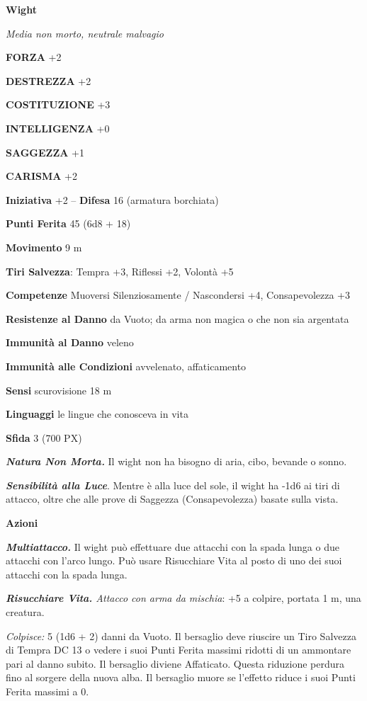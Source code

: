 \begin{multicols}{2}
	\medskip{}\textbf{Wight}

	\textit{Media non morto, neutrale malvagio}

	\textbf{FORZA} +2

	\textbf{DESTREZZA} +2

	\textbf{COSTITUZIONE} +3

	\textbf{INTELLIGENZA} +0

	\textbf{SAGGEZZA} +1

	\textbf{CARISMA} +2

	\textbf{Iniziativa} +2 -- \textbf{Difesa} 16 (armatura borchiata)

	\textbf{Punti Ferita} 45 (6d8 + 18)

	\textbf{Movimento} 9 m

	\textbf{Tiri Salvezza}: Tempra +3, Riflessi +2, Volontà +5

	\textbf{Competenze} Muoversi Silenziosamente / Nascondersi +4, Consapevolezza +3

	\textbf{Resistenze al Danno} da Vuoto; da arma non magica o che non sia argentata

	\textbf{Immunità al Danno} veleno

	\textbf{Immunità alle Condizioni} avvelenato, affaticamento

	\textbf{Sensi} scurovisione 18 m

	\textbf{Linguaggi} le lingue che conosceva in vita

	\textbf{Sfida} 3 (700 PX)

	\textit{\textbf{Natura Non Morta.}} Il wight non ha bisogno di aria, cibo, bevande o sonno.

	\textit{\textbf{Sensibilità alla Luce}}. Mentre è alla luce del sole, il wight ha -1d6 ai tiri di attacco, oltre che alle prove di Saggezza (Consapevolezza) basate sulla vista.

	\textbf{Azioni}

	\textit{\textbf{Multiattacco.}} Il wight può effettuare due attacchi con la spada lunga o due attacchi con l'arco lungo. Può usare Risucchiare Vita al posto di uno dei suoi attacchi con la spada lunga.

	\textit{\textbf{Risucchiare Vita.} Attacco con arma da mischia}: +5 a colpire, portata 1 m, una creatura.

	\textit{Colpisce:} 5 (1d6 + 2) danni da Vuoto. Il bersaglio deve riuscire un Tiro Salvezza di Tempra DC 13 o vedere i suoi Punti Ferita massimi ridotti di un ammontare pari al danno subito. Il bersaglio diviene Affaticato. Questa riduzione perdura fino al sorgere della nuova alba. Il bersaglio muore se l'effetto riduce i suoi Punti Ferita massimi a 0.


\end{multicols}
